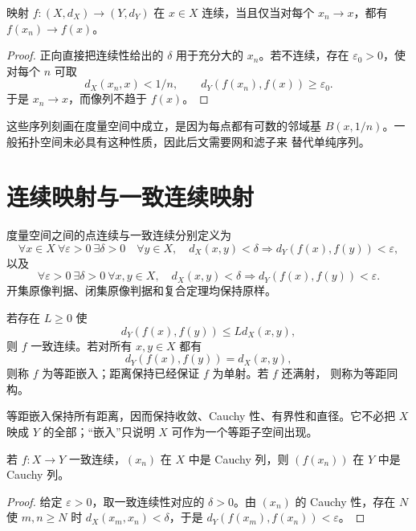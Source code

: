 \begin{theorem}[连续性的序列判据]
\label{thm:metric-continuity-sequential}
映射 \(f:(X,d_X)\to(Y,d_Y)\) 在 \(x\in X\) 连续，当且仅当对每个
\(x_n\to x\)，都有 \(f(x_n)\to f(x)\)。
\end{theorem}

\begin{proof}
正向直接把连续性给出的 \(\delta\) 用于充分大的 \(x_n\)。若不连续，存在
\(\varepsilon_0>0\)，使对每个 \(n\) 可取
\[
 d_X(x_n,x)<1/n,\qquad
 d_Y(f(x_n),f(x))\ge\varepsilon_0.
\]
于是 \(x_n\to x\)，而像列不趋于 \(f(x)\)。
\end{proof}

这些序列刻画在度量空间中成立，是因为每点都有可数的邻域基
\(B(x,1/n)\)。一般拓扑空间未必具有这种性质，因此后文需要网和滤子来
替代单纯序列。

\section{连续映射与一致连续映射}

度量空间之间的点连续与一致连续分别定义为
\[
 \forall x\in X\ \forall\varepsilon>0\ \exists\delta>0\quad
 \forall y\in X,\quad
 d_X(x,y)<\delta\Rightarrow d_Y(f(x),f(y))<\varepsilon,
\]
以及
\[
 \forall\varepsilon>0\ \exists\delta>0\ \forall x,y\in X,\quad
 d_X(x,y)<\delta\Rightarrow d_Y(f(x),f(y))<\varepsilon.
\]
开集原像判据、闭集原像判据和复合定理均保持原样。

\begin{proposition}
若存在 \(L\ge0\) 使
\[
 d_Y(f(x),f(y))\le Ld_X(x,y),
\]
则 \(f\) 一致连续。若对所有 \(x,y\in X\) 都有
\[
 d_Y(f(x),f(y))=d_X(x,y),
\]
则称 \(f\) 为等距嵌入；距离保持已经保证 \(f\) 为单射。若 \(f\) 还满射，
则称为等距同构。
\end{proposition}

等距嵌入保持所有距离，因而保持收敛、Cauchy 性、有界性和直径。它不必把
\(X\) 映成 \(Y\) 的全部；“嵌入”只说明 \(X\) 可作为一个等距子空间出现。

\begin{theorem}
\label{thm:uniform-continuity-preserves-cauchy-metric}
若 \(f:X\to Y\) 一致连续，\((x_n)\) 在 \(X\) 中是 Cauchy 列，则
\((f(x_n))\) 在 \(Y\) 中是 Cauchy 列。
\end{theorem}

\begin{proof}
给定 \(\varepsilon>0\)，取一致连续性对应的 \(\delta>0\)。由
\((x_n)\) 的 Cauchy 性，存在 \(N\) 使 \(m,n\ge N\) 时
\(d_X(x_m,x_n)<\delta\)，于是
\(d_Y(f(x_m),f(x_n))<\varepsilon\)。
\end{proof}

